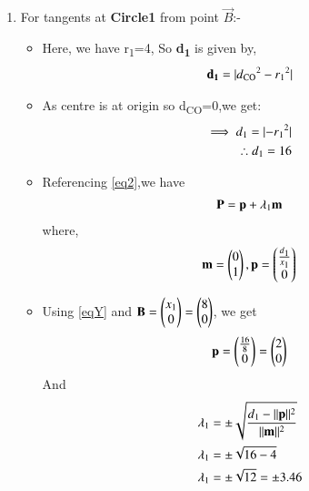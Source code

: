 \documentclass[journal,12pt,twocolumn]{IEEEtran}
\begin{document}
\begin{enumerate}
\begin{proof}
\begin{itemize}
\begin{align}
\lambda^2&=\frac{d^2-\norm{\vec{n}}^2}{\norm{\vec{m}}^2}
\\
\lambda &= \pm \sqrt{\frac{d^2-\norm{\vec{n}}^2}{\norm{\vec{m}}^2}} 
\end{align}
\end{itemize}
\end{proof}
\item For tangents at \textbf{Circle1} from point $\vec{B}$:-
\begin{itemize}
\item Here, we have r\textsubscript{1}=4, So \textbf{d\textsubscript{1}} is given by,
\begin{align}
 \textbf{d\textsubscript{1}} = \abs{d\textsubscript{CO}^2-r\textsubscript{1}^2}
 \end{align}
\item  As  centre is at origin so d\textsubscript{CO}=0,we get:
\begin{align}
 \implies d\textsubscript{1}=\abs{-r\textsubscript{1}^2} 
 \\
  \therefore  d\textsubscript{1}=16 \label{eqY}
\end{align}
\item Referencing \eqref{eq2},we have
\begin{align}
 \vec{P}=\vec{p}+\lambda\textsubscript{1}\vec{m}   \label{eqa}
\end{align}
where,
\begin{align}
 \vec{m}=\myvec{0\\1},\vec{p}=\myvec{\frac{d\textsubscript{1}}{x\textsubscript{1}}\\0}
 \end{align}
 \item Using \eqref{eqY} and $\vec{B}=\myvec{x\textsubscript{1}\\0}=\myvec{8\\0}$, we get 
 \begin{align}
 \vec{p}=\myvec{\frac{16}{8}\\0}=\myvec{2\\0}
\end{align}
And
\begin{align}
\lambda\textsubscript{1} &= \pm\sqrt{\frac{d\textsubscript{1}-\norm{\vec{p}}^2}{\norm{\vec{m}}^2}}
\\
\lambda\textsubscript{1} &= \pm\sqrt{16-4}
\\
\lambda\textsubscript{1} &= \pm\sqrt{12}=\pm 3.46
\end{align}
\end{itemize}

\end{enumerate}
\end{document}
